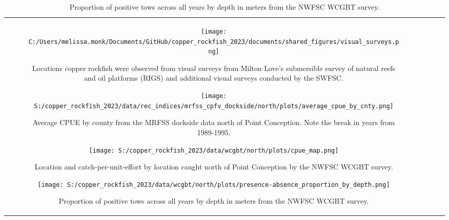 \documentclass[11pt,
  letterpaper,
]{article}
\begin{document}
\begin{longtable}[t]{c>{\centering\arraybackslash}p{2cm}>{\centering\arraybackslash}p{2cm}>{\centering\arraybackslash}p{2cm}}
\pagebreak

\begin{figure}
{\centering
\texttt{[image: C:/Users/melissa.monk/Documents/GitHub/copper\_rockfish\_2023/documents/shared\_figures/visual\_surveys.png]}
}
\caption{Locations copper rockfish were observed from visual surveys from Milton Love's submersible survey of natural reefs and oil platforms (RIGS) and additional visual surveys conducted by the SWFSC.\label{fig:visual-surveys}}
\end{figure}

\begin{figure}
{\centering
\texttt{[image: S:/copper\_rockfish\_2023/data/rec\_indices/mrfss\_cpfv\_dockside/north/plots/average\_cpue\_by\_cnty.png]}
}
\caption{Average CPUE by county from the MRFSS dockside data north of Point Conception. Note the break in years from 1989-1995.\label{fig:mrfss-cpue-county}}
\end{figure}

\begin{figure}
{\centering
\texttt{[image: S:/copper\_rockfish\_2023/data/wcgbt/north/plots/cpue\_map.png]}
}
\caption{Location and catch-per-unit-effort by location caught north of Point Conception by the NWFSC WCGBT survey.\label{fig:wcgbt-cpue}}
\end{figure}

\pagebreak

\begin{figure}
{\centering
\texttt{[image: S:/copper\_rockfish\_2023/data/wcgbt/north/plots/presence-absence\_proportion\_by\_depth.png]}
}
\caption{Proportion of positive tows across all years by depth in meters from the NWFSC WCGBT survey.\label{fig:wcgbt-depth}}
\end{figure}

\pagebreak


\end{longtable}
\end{document}
